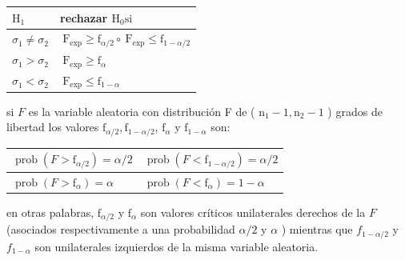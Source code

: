 \documentclass[
]{article}
\begin{document}
\begin{longtable}[]{@{}
  >{\centering\arraybackslash}p{}
  >{\centering\arraybackslash}p{}@{}}
\toprule\noalign{}
\begin{minipage}[b]{\linewidth}\centering
\(\mathrm{H}_{1}\)
\end{minipage} & \begin{minipage}[b]{\linewidth}\centering
rechazar \(\mathrm{H}_{0} \mathrm{si}\)
\end{minipage} \\
\midrule\noalign{}
\endhead
\bottomrule\noalign{}
\endlastfoot
\(\sigma_{1} \neq \sigma_{2}\) & \(\mathrm{~F}_{\exp } \geq \mathrm{f}_{\alpha / 2} \circ \mathrm{~F}_{\exp } \leq \mathrm{f}_{1-\alpha / 2}\) \\
\(\sigma_{1}>\sigma_{2}\) & \(\mathrm{~F}_{\exp } \geq \mathrm{f}_{\alpha}\) \\
\(\sigma_{1}<\sigma_{2}\) & \(\mathrm{~F}_{\exp } \leq \mathrm{f}_{1-\alpha}\) \\
\end{longtable}

si \(F\) es la variable aleatoria con distribución F de ( \(\mathrm{n}_{1}-1, \mathrm{n}_{2}-1\) ) grados de libertad los valores \(\mathrm{f}_{\alpha / 2}, \mathrm{f}_{1-\alpha / 2}\), \(\mathrm{f}_{\alpha}\) y \(\mathrm{f}_{1-\alpha}\) son:

\begin{longtable}[]{@{}
  >{\centering\arraybackslash}p{}
  >{\centering\arraybackslash}p{}@{}}
\toprule\noalign{}
\begin{minipage}[b]{\linewidth}\centering
\(\operatorname{prob}\left(F>\mathrm{f}_{\alpha / 2}\right)=\alpha / 2\)
\end{minipage} & \begin{minipage}[b]{\linewidth}\centering
\(\operatorname{prob}\left(F<\mathrm{f}_{1-\alpha / 2}\right)=\alpha / 2\)
\end{minipage} \\
\midrule\noalign{}
\endhead
\bottomrule\noalign{}
\endlastfoot
\(\operatorname{prob}\left(F>\mathrm{f}_{\alpha}\right)=\alpha\) & \(\operatorname{prob}\left(F<\mathrm{f}_{\alpha}\right)=1-\alpha\) \\
\end{longtable}

en otras palabras, \(\mathrm{f}_{\alpha / 2}\) y \(\mathrm{f}_{\alpha}\) son valores críticos unilaterales derechos de la \(F\) (asociados respectivamente a una probabilidad \(\alpha / 2\) y \(\alpha\) ) mientras que \(f_{1-\alpha / 2}\) y \(f_{1-\alpha}\) son unilaterales izquierdos de la misma variable aleatoria.
\end{document}
